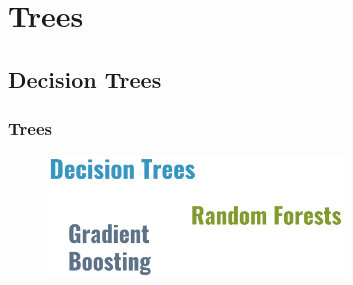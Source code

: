 \documentclass[
    utf8,
    aspectratio=169
]{beamer}  %
\begin{document}
\section{Trees}

\subsection{Decision Trees}

\begin{frame}
	\frametitle{Trees}
	\begin{figure}
		\includegraphics[width=0.7\textwidth]{pics/tree_outline.png}
	\end{figure}
\end{frame}
\end{document}
